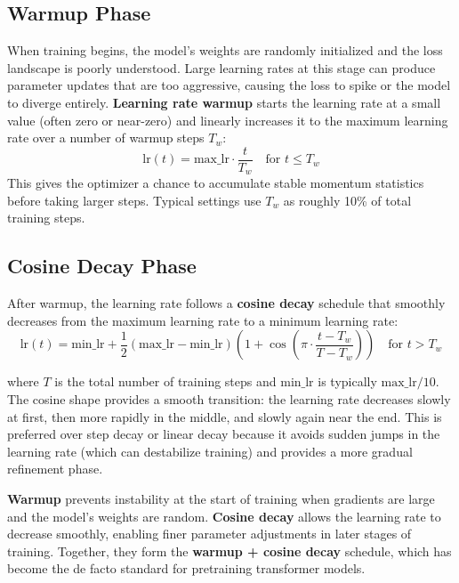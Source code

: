 \subsection{Warmup Phase}

When training begins, the model's weights are randomly initialized and the loss landscape is poorly understood. Large learning rates at this stage can produce parameter updates that are too aggressive, causing the loss to spike or the model to diverge entirely. \textbf{Learning rate warmup} starts the learning rate at a small value (often zero or near-zero) and linearly increases it to the maximum learning rate over a number of warmup steps $T_w$:
\[
  \text{lr}(t) = \text{max\_lr} \cdot \frac{t}{T_w} \quad \text{for } t \leq T_w
\]
This gives the optimizer a chance to accumulate stable momentum statistics before taking larger steps. Typical settings use $T_w$ as roughly 10\% of total training steps.

\subsection{Cosine Decay Phase}

After warmup, the learning rate follows a \textbf{cosine decay} schedule that smoothly decreases from the maximum learning rate to a minimum learning rate:
\[
  \text{lr}(t) = \text{min\_lr} + \frac{1}{2}(\text{max\_lr} - \text{min\_lr})
  \left(1 + \cos\!\left(\pi \cdot \frac{t - T_w}{T - T_w}\right)\right)
  \quad \text{for } t > T_w
\]

where $T$ is the total number of training steps and $\text{min\_lr}$ is typically $\text{max\_lr} / 10$. The cosine shape provides a smooth transition: the learning rate decreases slowly at first, then more rapidly in the middle, and slowly again near the end. This is preferred over step decay or linear decay because it avoids sudden jumps in the learning rate (which can destabilize training) and provides a more gradual refinement phase.

\begin{keyconcept}
  \textbf{Warmup} prevents instability at the start of training when gradients are large and the model's weights are random. \textbf{Cosine decay} allows the learning rate to decrease smoothly, enabling finer parameter adjustments in later stages of training. Together, they form the \textbf{warmup + cosine decay} schedule, which has become the de facto standard for pretraining transformer models.
\end{keyconcept}

